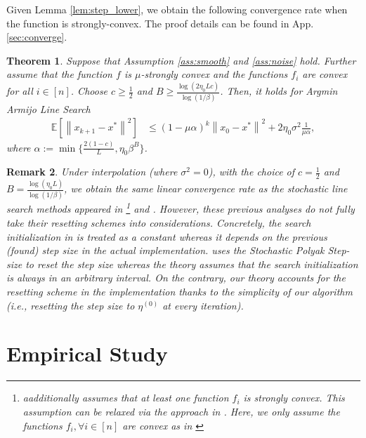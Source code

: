 \documentclass[10pt]{article} %
\newtheorem{theorem}{Theorem}
\newtheorem{remark}[theorem]{Remark}
\newcommand{\EE}{\mathbb{E}}
\newcommand{\norm}[1]{\left \lVert #1 \right \rVert}
\begin{document}
Given Lemma \ref{lem:step_lower}, we obtain the following convergence rate when the function is strongly-convex. The proof details can be found in App. \ref{sec:converge}. 

\begin{theorem} Suppose that Assumption \ref{ass:smooth} and \ref{ass:noise} hold. Further assume that the function $f$ is $\mu$-strongly convex and the functions $f_i$ are convex for all $i \in [n]$. Choose $c \geq \frac{1}{2}$ and $B \geq \frac{\log(2 \eta_0 L c)}{\log(1/\beta)}$. Then, it holds for \textit{Argmin Armijo Line Search}
\begin{align*}
    \EE[\norm{x_{k+1}- x^*}^2] 
    &\leq (1 - \mu\alpha)^k \norm{x_{0}- x^*}^2 + 2 \eta_0 \sigma^2 \frac{1}{\mu \alpha}, 
\end{align*}
where $\alpha:=\min\{ \frac{2(1-c)}{L}, \eta_0 \beta^B\}$.     
\end{theorem}

\begin{remark}
 Under interpolation (where $\sigma^2 = 0$),     with the choice of $c=\frac{1}{2}$ and $B = \frac{\log(\eta_0 L)}{\log(1/\beta)}$, we obtain the same linear convergence rate as the stochastic line search methods appeared in  \citet{vaswani2019painless}\footnote{\citet{vaswani2019painless} aadditionally assumes that at least one function $f_i$ is strongly convex. This assumption can be relaxed via the approach in \citet[Thm. 3.1]{loizou2021stochastic}. Here, we only assume the functions $f_i,\forall i\in[n]$ are convex as in \citet{loizou2021stochastic}} and  \citet{galli2023monotone}. However, these previous analyses do not fully take their resetting schemes into considerations. Concretely, the search initialization  in \citet{vaswani2019painless} is treated as a constant whereas it depends on the previous (found) step size in the actual implementation. \citet{galli2023monotone} uses the Stochastic Polyak Step-size \citep{loizou2021stochastic} to reset the step size whereas the theory assumes that the search initialization is always in an arbitrary interval. On the contrary, our theory accounts for the resetting scheme in the implementation thanks to the simplicity of our algorithm (i.e., resetting the step size to $\eta^{(0)}$ at every iteration).      
\end{remark}

\section{Empirical Study}
\end{document}
